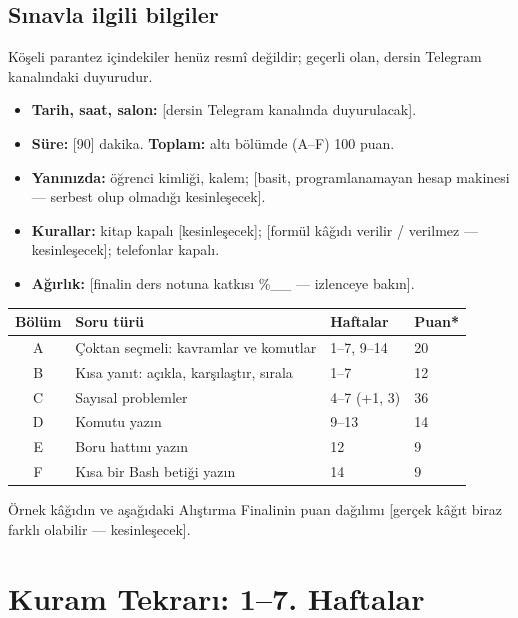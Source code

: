 \documentclass[11pt,a4paper]{article}
\begin{document}
\subsection{Sınavla ilgili bilgiler}
Köşeli parantez içindekiler henüz resmî değildir; geçerli olan, dersin Telegram kanalındaki duyurudur.
\begin{itemize}
  \item \textbf{Tarih, saat, salon:} [dersin Telegram kanalında duyurulacak].
  \item \textbf{Süre:} [90] dakika. \textbf{Toplam:} altı bölümde (A--F) 100 puan.
  \item \textbf{Yanınızda:} öğrenci kimliği, kalem; [basit, programlanamayan hesap makinesi --- serbest olup olmadığı kesinleşecek].
  \item \textbf{Kurallar:} kitap kapalı [kesinleşecek]; [formül kâğıdı verilir / verilmez --- kesinleşecek]; telefonlar kapalı.
  \item \textbf{Ağırlık:} [finalin ders notuna katkısı \%\_\_ --- izlenceye bakın].
\end{itemize}

\begin{center}
\renewcommand{\arraystretch}{1.2}
\begin{tabularx}{\linewidth}{@{}c>{\raggedright\arraybackslash}Xll@{}}
\toprule
\textbf{Bölüm} & \textbf{Soru türü} & \textbf{Haftalar} & \textbf{Puan*} \\
\midrule
A & Çoktan seçmeli: kavramlar ve komutlar & 1--7, 9--14 & 20 \\
B & Kısa yanıt: açıkla, karşılaştır, sırala & 1--7 & 12 \\
C & Sayısal problemler & 4--7 (+1, 3) & 36 \\
D & Komutu yazın & 9--13 & 14 \\
E & Boru hattını yazın & 12 & 9 \\
F & Kısa bir Bash betiği yazın & 14 & 9 \\
\bottomrule
\end{tabularx}
\end{center}
{\small *Örnek kâğıdın ve aşağıdaki Alıştırma Finalinin puan dağılımı [gerçek kâğıt biraz farklı olabilir --- kesinleşecek].}

\section{Kuram Tekrarı: 1--7. Haftalar}
\label{sec:theory}
\end{document}
